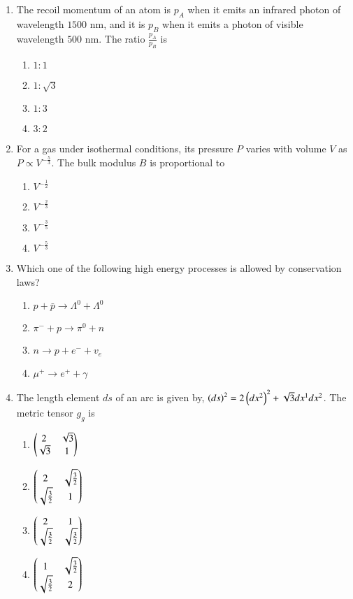 \documentclass[journal,12pt,onecolumn]{IEEEtran}
\theoremstyle{remark}
\begin{document}
\begin{enumerate}
\item The recoil momentum of an atom is $p_A$ when it emits an infrared photon of wavelength $1500$ nm, and it is $p_B$ when it emits a photon of visible wavelength $500$ nm. The ratio $\frac{p_A}{p_B}$ is
\hfill{}
\begin{enumerate}
\item $1:1$
\item $1:\sqrt{3}$
\item $1:3$
\item $3:2$
\end{enumerate}

\item For a gas under isothermal conditions, its pressure $P$ varies with volume $V$ as $P \propto V^{-\frac{5}{3}}$. The bulk modulus $B$ is proportional to
\hfill{}
\begin{enumerate}
\item $V^{-\frac{1}{2}}$
\item $V^{-\frac{2}{3}}$
\item $V^{-\frac{3}{5}}$
\item $V^{-\frac{5}{3}}$
\end{enumerate}

\item Which one of the following high energy processes is allowed by conservation laws?
\hfill{}
\begin{enumerate}
\item $p + \bar{p} \to \Lambda^0 + \Lambda^0$
\item $\pi^- + p \to \pi^0 + n$
\item $n \to p + e^- + v_e$
\item $\mu^+ \to e^+ + \gamma$
\end{enumerate}

\item The length element $ds$ of an arc is given by, $\left(ds\right)^2 = 2\left(dx^2\right)^2 + \sqrt{3}dx^1dx^2$. The metric tensor $g_g$ is
\hfill{}
\begin{enumerate}
\item $\begin{pmatrix}2 & \sqrt{3}\\\sqrt{3} & 1\end{pmatrix}$
\item $\begin{pmatrix}2 & \sqrt{\frac{3}{2}}\\\sqrt{\frac{3}{2}} & 1\end{pmatrix}$
\item $\begin{pmatrix}2 & 1\\\sqrt{\frac{3}{2}} & \sqrt{\frac{3}{2}}\end{pmatrix}$
\item $\begin{pmatrix}1 & \sqrt{\frac{3}{2}}\\\sqrt{\frac{3}{2}} & 2\end{pmatrix}$
\end{enumerate}


\end{enumerate}
\end{document}
